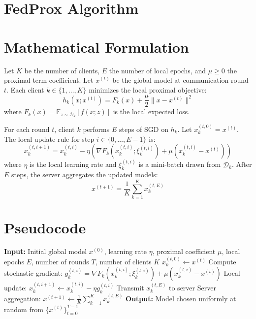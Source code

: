 \documentclass{article}
\begin{document}
\section*{FedProx Algorithm}
\section*{Mathematical Formulation}
Let $K$ be the number of clients, $E$ the number of local epochs, and $\mu \geq 0$ the proximal term coefficient. Let $x^{(t)}$ be the global model at communication round $t$. Each client $k \in \{1, \dots, K\}$ minimizes the local proximal objective:
\begin{equation}
h_k(x; x^{(t)}) = F_k(x) + \frac{\mu}{2} \|x - x^{(t)}\|^2
\end{equation}
where $F_k(x) = \mathbb{E}_{z \sim \mathcal{D}_k}[f(x; z)]$ is the local expected loss. 

For each round $t$, client $k$ performs $E$ steps of SGD on $h_k$. Let $x_k^{(t, 0)} = x^{(t)}$. The local update rule for step $i \in \{0, \dots, E-1\}$ is:
\begin{equation}
x_k^{(t, i+1)} = x_k^{(t, i)} - \eta \left( \nabla F_k(x_k^{(t, i)}; \xi_k^{(t, i)}) + \mu (x_k^{(t, i)} - x^{(t)}) \right)
\end{equation}
where $\eta$ is the local learning rate and $\xi_k^{(t, i)}$ is a mini-batch drawn from $\mathcal{D}_k$. After $E$ steps, the server aggregates the updated models:
\begin{equation}
x^{(t+1)} = \frac{1}{K} \sum_{k=1}^K x_k^{(t, E)}
\end{equation}

\section*{Pseudocode}
\begin{algorithmic}[1]
\State \textbf{Input:} Initial global model $x^{(0)}$, learning rate $\eta$, proximal coefficient $\mu$, local epochs $E$, number of rounds $T$, number of clients $K$
        \State $x_k^{(t, 0)} \gets x^{(t)}$
            \State Compute stochastic gradient: $g_k^{(t, i)} = \nabla F_k(x_k^{(t, i)}; \xi_k^{(t, i)}) + \mu (x_k^{(t, i)} - x^{(t)})$
            \State Local update: $x_k^{(t, i+1)} \gets x_k^{(t, i)} - \eta g_k^{(t, i)}$
        \EndFor
        \State Transmit $x_k^{(t, E)}$ to server
    \EndFor
    \State Server aggregation: $x^{(t+1)} \gets \frac{1}{K} \sum_{k=1}^K x_k^{(t, E)}$
\EndFor
\State \textbf{Output:} Model chosen uniformly at random from $\{x^{(t)}\}_{t=0}^{T-1}$
\end{algorithmic}
\end{document}
